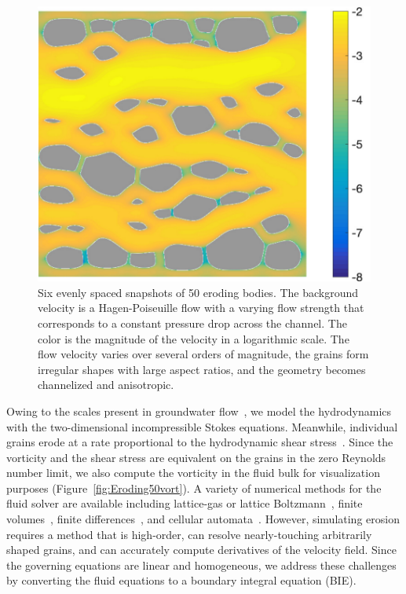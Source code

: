 \documentclass[preprint,10pt]{elsarticle}
\begin{document}
\begin{figure}[H]
\begin{center}
\includegraphics[height = 0.31 \textwidth]{./figs/vel_log_50b400}
\caption{\label{fig:Eroding50vel} Six evenly spaced snapshots of 50
eroding bodies.  The background velocity is a Hagen-Poiseuille flow with
a varying flow strength that corresponds to a constant pressure drop
across the channel. The color is the magnitude of the velocity in a
logarithmic scale. The flow velocity varies over several orders of
magnitude, the grains form irregular shapes with large aspect ratios,
and the geometry becomes channelized and anisotropic.}
\end{center}
\end{figure}

Owing to the scales present in groundwater flow~\cite{bea1972}, we model
the hydrodynamics with the two-dimensional incompressible Stokes
equations.  Meanwhile, individual grains erode at a rate proportional to
the hydrodynamic shear stress~\cite{wan-fel2004,
ris-moo-chi-she-zha2012, moore2013self, par-izu2000}.  Since the
vorticity and the shear stress are equivalent on the grains in the zero
Reynolds number limit, we also compute the vorticity in the fluid bulk
for visualization purposes (Figure~\ref{fig:Eroding50vort}).  A variety
of numerical methods for the fluid solver are available including
lattice-gas or lattice Boltzmann~\cite{kop-kat-tim1996, dar-mcc1998},
finite volumes~\cite{suo-liu-gan2019, den-ica-hid2018,
sie-ili-pri-riv-gua2019}, finite differences~\cite{leb-ded-dav-bou2007,
knu-car2005}, and cellular automata~\cite{rot1988}.  However, simulating
erosion requires a method that is high-order, can resolve
nearly-touching arbitrarily shaped grains, and can accurately compute
derivatives of the velocity field.  Since the governing equations are
linear and homogeneous, we address these challenges by converting the
fluid equations to a boundary integral equation (BIE).
\end{document}
